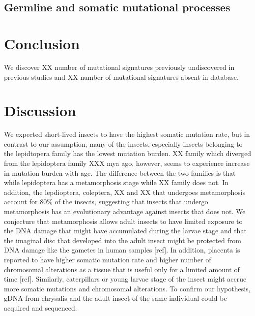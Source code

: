 \subsection{Germline and somatic mutational processes}

\section{Conclusion}

We discover XX number of mutational signatures previously undiscovered in previous studies and XX number of mutational signatures absent in database. 


\section{Discussion}



We expected short-lived insects to have the highest somatic mutation rate, but in contrast to our assumption, many of the insects, especially insects belonging to the lepidtopera family has the lowest mutation burden. XX family which diverged from the lepidoptera family XXX mya ago, however, seems to experience increase in mutation burden with age. The difference between the two families is that while lepidoptera has a metamorphosis stage while XX family does not. In addition, the lepdioptera, coleptera, XX and XX that undergoes metamorphosis account for 80\% of the insects, suggesting that insects that undergo metamorphosis has an evolutionary advantage against insects that does not. We conjecture that metamorphosis allows adult insects to have limited exposure to the DNA damage that might have accumulated during the larvae stage and that the imaginal disc that developed into the adult insect might be protected from DNA damage like the gametes in human samples [ref]. In addition, placenta is reported to have higher somatic mutation rate and higher number of chromosomal alterations as a tissue that is useful only for a limited amount of time [ref]. Similarly, caterpillars or young larvae stage of the insect might accrue more somatic mutations and chromosomal alterations. To confirm our hypothesis, gDNA from chrysalis and the adult insect of the same individual could be acquired and sequenced. 




